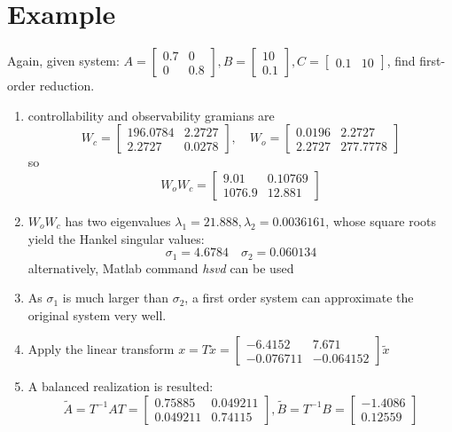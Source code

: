 \documentclass[10pt,a4paper,oneside]{article}
\begin{document}
\section{Example}
Again, given system: $
A=\left[\begin{array}{cc}{0.7} & {0} \\ {0} & {0.8}\end{array}\right], B=\left[\begin{array}{c}{10} \\ {0.1}\end{array}\right], C=\left[\begin{array}{ll}{0.1} & {10}\end{array}\right]
$, find first-order reduction.
\begin{enumerate}
\item controllability and observability gramians are
\[
W_{c}=\left[\begin{array}{cc}{196.0784} & {2.2727} \\ {2.2727} & {0.0278}\end{array}\right], \quad W_{o}=\left[\begin{array}{cc}{0.0196} & {2.2727} \\ {2.2727} & {277.7778}\end{array}\right]
\]
so
\[
W_{o} W_{c} = \left[\begin{array}{cc}{9.01} & {0.10769} \\ {1076.9} & {12.881}\end{array}\right]
\]
\item $W_oW_c$ has two eigenvalues $\lambda_{1}=21.888, \lambda_{2}=0.0036161$, whose square roots yield the Hankel singular values:
\[
\sigma_{1}=4.6784 \quad \sigma_{2}=0.060134
\]
alternatively, Matlab command \textit{hsvd} can be used
\item As $\sigma_{1}$ is much larger than $\sigma_{2}$, a first order system can approximate the original system very well.
\item Apply the linear transform $x=T \tilde{x}=\left[\begin{array}{cc}{-6.4152} & {7.671} \\ {-0.076711} & {-0.064152}\end{array}\right] \tilde{x}$
\item A balanced realization is resulted:
\[
\tilde{A}= T^{-1} A T=\left[\begin{array}{cc}{0.75885} & {0.049211} \\ {0.049211} & {0.74115}\end{array}\right], \tilde{B}=T^{-1} B=\left[\begin{array}{l}{-1.4086} \\ {0.12559}\end{array}\right]\]

\end{enumerate}
\end{document}
